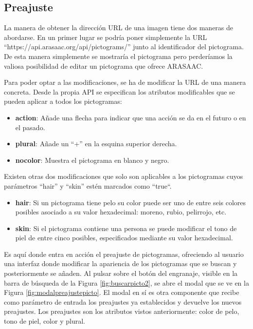 \subsection{Preajuste}
\label{preajuste}

La manera de obtener la dirección URL de una imagen tiene dos maneras de abordarse. En un primer lugar se podría poner simplemente la URL “https://api.arasaac.org/api/pictograms/” junto al identificador del pictograma. De esta manera simplemente se mostraría el pictograma pero perderíamos la valiosa posibilidad de editar un pictograma que ofrece ARASAAC.

Para poder optar a las modificaciones, se ha de modificar la URL de una manera concreta. Desde la propia API se especifican los atributos modificables que se pueden aplicar a todos los pictogramas:  


\begin{itemize}
	\item \textbf{action}: Añade una flecha para indicar que una acción se da en el futuro o en el pasado.
	\item \textbf{plural}: Añade un “+” en la esquina superior derecha.
	\item \textbf{nocolor}: Muestra el pictograma en blanco y negro.
	
\end{itemize}

Existen otras dos modificaciones que solo son aplicables a los pictogramas cuyos parámetros “hair” y “skin” estén marcados como “true“.


\begin{itemize}
	\item \textbf{hair}: Si un pictograma tiene pelo su color puede ser uno de entre seis colores posibles asociado a su valor hexadecimal: moreno, rubio, pelirrojo, etc.
	
	\item \textbf{skin}: Si el pictograma contiene una persona se puede modificar el tono de piel de entre cinco posibles, especificados mediante su valor hexadecimal.
	
\end{itemize}

Es aquí donde entra en acción el preajuste de pictogramas, ofreciendo al usuario una interfaz donde modificar la apariencia de los pictogramas que se buscan y posteriormente se añaden. Al pulsar sobre el botón del engranaje, visible en la barra de búsqueda de la Figura \ref{fig:buscarpicto2}, se abre el modal que se ve en la Figura \ref{fig:modalpreajustepicto}. El modal en sí es otra componente que recibe como parámetro de entrada los preajustes ya establecidos y devuelve los nuevos preajustes. Los preajustes son los atributos vistos anteriormente: color de pelo, tono de piel, color y plural.

